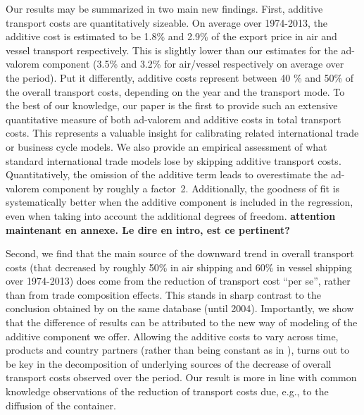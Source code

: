 \documentclass[a4paper,11pt]{article}
\begin{document}
Our results may be summarized in two main new findings. First, additive transport costs are quantitatively sizeable. On average over 1974-2013, the additive cost is estimated to be 1.8\% and 2.9\% of the export price in air and vessel transport respectively. This is slightly lower than our estimates for the ad-valorem component (3.5\% and 3.2\% for air/vessel respectively on average over the period). Put it differently, additive costs represent between 40 \% and 50\% of the overall transport costs, depending on the year and the transport mode. To the best of our knowledge, our paper is the first to provide such an extensive quantitative measure of both ad-valorem and additive costs in total transport costs. This represents a valuable insight for calibrating related international trade or business cycle models. We also provide an empirical assessment of what standard international trade models lose by skipping additive transport costs. Quantitatively, the omission of the additive term leads to overestimate the ad-valorem component by roughly a factor~2. Additionally, the goodness of fit is systematically better when the additive component is included in the regression, even when taking into account the additional degrees of freedom. \textbf{attention maintenant en annexe. Le dire en intro, est ce pertinent?}

Second, we find that the main source of the downward trend in overall transport costs (that decreased by roughly 50\% in air shipping and 60\% in vessel shipping over 1974-2013) does come from the reduction of transport cost ``per se'', rather than from trade composition effects. This stands in sharp contrast to the conclusion obtained by \cite{hummels2007} on the same database (until 2004). Importantly, we show that the difference of results can be attributed to the new way of modeling of the additive component we offer. Allowing the additive costs to vary  across time, products and country partners (rather than being constant as in \citealp{hummels2007}), turns out to be key in the decomposition of underlying sources of the decrease of overall transport costs observed over the period. Our result is more in line with common knowledge observations of the reduction of transport costs due, e.g., to the diffusion of the container.\smallskip
\end{document}
